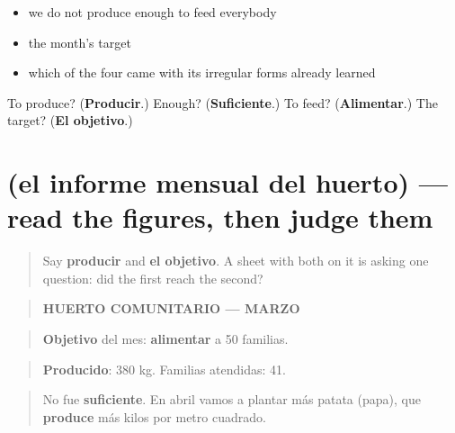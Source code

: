 \begin{itemize}
\raggedright
  \item we do not produce enough to feed everybody
  \item the month's target
  \item which of the four came with its irregular forms already learned
\end{itemize}

\begin{tcolorbox}[breakable,colback=teal!4,colframe=teal!35!black,title={Before you move on}]
To produce? (\textbf{Producir}.) Enough? (\textbf{Suficiente}.) To feed? (\textbf{Alimentar}.) The target? (\textbf{El objetivo}.)
\end{tcolorbox}
\section[Practice]{(el informe mensual del huerto) — read the figures, then judge them}

\label{lesson:ES-C467-sintesis-alimento}



\begin{quote}
Say \textbf{producir} and \textbf{el objetivo}. A sheet with both on it is asking one question: did the first reach the second?
\end{quote}

\begin{tcolorbox}[breakable,skin=enhanced,colback=orange!6,colframe=orange!45!black,boxrule=0.5pt,arc=1mm,left=6pt,right=6pt,top=4pt,bottom=4pt,fonttitle=\bfseries,title={Read this}]
\begin{quote}
\textbf{HUERTO COMUNITARIO — MARZO}
\end{quote}

\begin{quote}
\textbf{Objetivo} del mes: \textbf{alimentar} a 50 familias.
\end{quote}

\begin{quote}
\textbf{Producido}: 380 kg. Familias atendidas: 41.
\end{quote}

\begin{quote}
No fue \textbf{suficiente}. En abril vamos a plantar más patata (papa), que \textbf{produce} más kilos por metro cuadrado.
\end{quote}
\end{tcolorbox}

